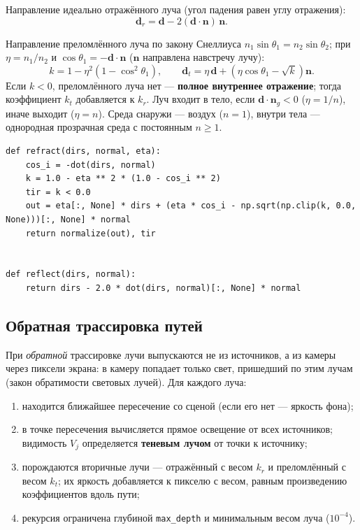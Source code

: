 \documentclass[12pt,a4paper]{article}
\newcommand{\vect}[1]{\mathbf{#1}}
\begin{document}
Направление идеально отражённого луча (угол падения равен углу отражения):
\begin{equation}
\vect d_r = \vect d - 2(\vect d\cdot\vect n)\,\vect n.
\end{equation}

Направление преломлённого луча по закону Снеллиуса $n_1\sin\theta_1 = n_2\sin\theta_2$; при $\eta = n_1/n_2$ и
$\cos\theta_1 = -\vect d\cdot\vect n$ ($\vect n$ направлена навстречу лучу):
\begin{equation}
k = 1 - \eta^2(1-\cos^2\theta_1),\qquad
\vect d_t = \eta\,\vect d + \left(\eta\cos\theta_1 - \sqrt{k}\right)\vect n.
\end{equation}
Если $k<0$, преломлённого луча нет — \textbf{полное внутреннее отражение}; тогда коэффициент $k_t$ добавляется к
$k_r$. Луч входит в тело, если $\vect d\cdot\vect n_g < 0$ ($\eta = 1/n$), иначе выходит ($\eta = n$).
Среда снаружи — воздух ($n=1$), внутри тела — однородная прозрачная среда с постоянным $n\ge1$.

\begin{lstlisting}
def refract(dirs, normal, eta):
    cos_i = -dot(dirs, normal)
    k = 1.0 - eta ** 2 * (1.0 - cos_i ** 2)
    tir = k < 0.0
    out = eta[:, None] * dirs + (eta * cos_i - np.sqrt(np.clip(k, 0.0, None)))[:, None] * normal
    return normalize(out), tir


def reflect(dirs, normal):
    return dirs - 2.0 * dot(dirs, normal)[:, None] * normal
\end{lstlisting}

\subsection{Обратная трассировка путей}

При \emph{обратной} трассировке лучи выпускаются не из источников, а из камеры через пиксели экрана: в камеру
попадает только свет, пришедший по этим лучам (закон обратимости световых лучей). Для каждого луча:

\begin{enumerate}
\item находится ближайшее пересечение со сценой (если его нет — яркость фона);
\item в точке пересечения вычисляется прямое освещение от всех источников; видимость $V_j$ определяется
      \textbf{теневым лучом} от точки к источнику;
\item порождаются вторичные лучи — отражённый с весом $k_r$ и преломлённый с весом $k_t$; их яркость добавляется
      к пикселю с весом, равным произведению коэффициентов вдоль пути;
\item рекурсия ограничена глубиной \texttt{max\_depth} и минимальным весом луча ($10^{-4}$).
\end{enumerate}
\end{document}
